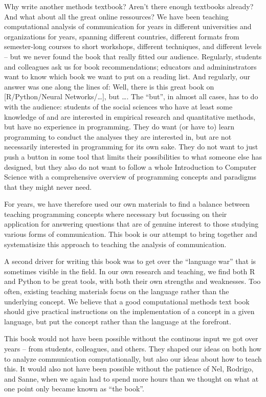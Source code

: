 \begin{preface}
Why write another methods textbook? Aren't there enough textbooks already? And what about all the great online ressources?
We have been teaching computational analysis of communication for years in different universities and organizations
for years, spanning different countries, different formats from semester-long courses to short workshops, different techniques,
and different levels -- but we never found the book that really fitted our audience. Regularly, students and colleagues ask
us for book recommendations; educators and admininstrators want to know which book we want to put on a reading list. And regularly,
our answer was one along the lines of: Well, there is this great book on [R/Python/Neural Networks/\ldots], but \ldots.
The ``but'', in almost all cases, has to do with the audience: students of the social sciences who have at least some knowledge of and are
interested in empirical research and quantitative methods, but have no experience in programming. They do want (or have to)
learn programming to conduct the analyses they are interested in, but are not necessarily interested in programming for its own sake.
They do not want to just push a button in some tool that limits their possibilities to what someone else has designed, but they
also do not want to follow a whole Introduction to Computer Science with a comprehensive overview of programming concepts and paradigms
that they might never need.

For years, we have therefore used our own materials to find a balance between teaching programming concepts where necessary but
focussing on their application for answering questions that are of genuine interest to those studying various forms of communication.
This book is our attempt to bring together and systematisize this approach to teaching the analysis of communication.

A second driver for writing this book was to get over the ``language war'' that is sometimes visible in the field. In our own research
and teaching, we find both R and Python to be great tools, with both their own strengths and weaknesses. Too often, existing
teaching materials focus on the language rather than the underlying concept. We believe that a good computational methods text book
should give practical instructions on the implementation of a concept in a given language, but put the concept rather than the language at the forefront.

This book would not have been possible without the continous input we got over years -- from students, colleagues, and others.
They shaped our ideas on both how to analyze communication computationally, but also our ideas about how to teach this. It
would also not have been possible without the patience of Nel, Rodrigo, and Sanne, when we again had to spend more hours than
we thought on what at one point only became known as ``the book''.

\end{preface}


